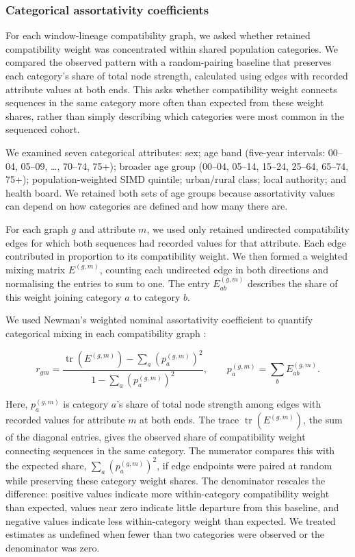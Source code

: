 \subsubsection*{Categorical assortativity coefficients}\label{sec:ch4_assortativity_matrices}

For each window-lineage compatibility graph, we asked whether retained compatibility weight was concentrated within shared population categories. We compared the observed pattern with a random-pairing baseline that preserves each category's share of total node strength, calculated using edges with recorded attribute values at both ends. This asks whether compatibility weight connects sequences in the same category more often than expected from these weight shares, rather than simply describing which categories were most common in the sequenced cohort.

We examined seven categorical attributes: sex; age band (five-year intervals: 00--04, 05--09, \ldots, 70--74, 75+); broader age group (00--04, 05--14, 15--24, 25--64, 65--74, 75+); population-weighted SIMD quintile; urban/rural class; local authority; and health board. We retained both sets of age groups because assortativity values can depend on how categories are defined and how many there are.

For each graph $g$ and attribute $m$, we used only retained undirected compatibility edges for which both sequences had recorded values for that attribute. Each edge contributed in proportion to its compatibility weight. We then formed a weighted mixing matrix $E^{(g,m)}$, counting each undirected edge in both directions and normalising the entries to sum to one. The entry $E^{(g,m)}_{ab}$ describes the share of this weight joining category $a$ to category $b$.

We used Newman's weighted nominal assortativity coefficient to quantify categorical mixing in each compatibility graph \citep{Newman2003}:

\[
	r_{gm}
	=
	\frac{
		\operatorname{tr}\!\left(E^{(g,m)}\right)
		-
		\sum_a \left(p^{(g,m)}_a\right)^2
	}{
		1 -
		\sum_a \left(p^{(g,m)}_a\right)^2
	},
	\qquad
	p^{(g,m)}_a=\sum_b E^{(g,m)}_{ab}.
\]

Here, $p^{(g,m)}_a$ is category $a$'s share of total node strength among edges with recorded values for attribute $m$ at both ends. The trace $\operatorname{tr}\!\left(E^{(g,m)}\right)$, the sum of the diagonal entries, gives the observed share of compatibility weight connecting sequences in the same category. The numerator compares this with the expected share, $\sum_a \left(p^{(g,m)}_a\right)^2$, if edge endpoints were paired at random while preserving these category weight shares. The denominator rescales the difference: positive values indicate more within-category compatibility weight than expected, values near zero indicate little departure from this baseline, and negative values indicate less within-category weight than expected. We treated estimates as undefined when fewer than two categories were observed or the denominator was zero.

